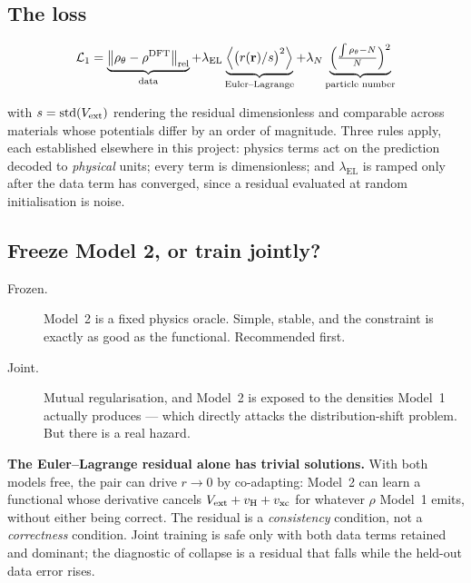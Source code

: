 \subsection{The loss}

\begin{equation}
  \mathcal{L}_1 =
    \underbrace{\bigl\lVert \rho_\theta - \rho^{\mathrm{DFT}} \bigr\rVert_{\mathrm{rel}}}_{\text{data}}
    + \lambda_{\mathrm{EL}}
      \underbrace{\Bigl\langle \bigl(r(\mathbf{r})/s\bigr)^2 \Bigr\rangle}_{\text{Euler--Lagrange}}
    + \lambda_{N}
      \underbrace{\Bigl(\tfrac{\int\rho_\theta - N}{N}\Bigr)^2}_{\text{particle number}}
\end{equation}

with $s=\operatorname{std}(V_{\mathrm{ext}})$ rendering the residual dimensionless and
comparable across materials whose potentials differ by an order of magnitude.
Three rules apply, each established elsewhere in this project: physics terms act
on the prediction decoded to \emph{physical} units; every term is
dimensionless; and $\lambda_{\mathrm{EL}}$ is ramped only after the data term
has converged, since a residual evaluated at random initialisation is noise.

\subsection{Freeze Model 2, or train jointly?}

\begin{description}
  \item[Frozen.] Model~2 is a fixed physics oracle. Simple, stable, and the
    constraint is exactly as good as the functional. Recommended first.
  \item[Joint.] Mutual regularisation, and Model~2 is exposed to the densities
    Model~1 actually produces --- which directly attacks the distribution-shift
    problem. But there is a real hazard.
\end{description}

\begin{pwarn}
\textbf{The Euler--Lagrange residual alone has trivial solutions.} With both
models free, the pair can drive $r\to0$ by co-adapting: Model~2 can learn a
functional whose derivative cancels $V_{\mathrm{ext}}+v_{\mathrm{H}}+v_{\mathrm{xc}}$ for whatever $\rho$
Model~1 emits, without either being correct. The residual is a
\emph{consistency} condition, not a \emph{correctness} condition. Joint training
is safe only with both data terms retained and dominant; the diagnostic of
collapse is a residual that falls while the held-out data error rises.
\end{pwarn}

